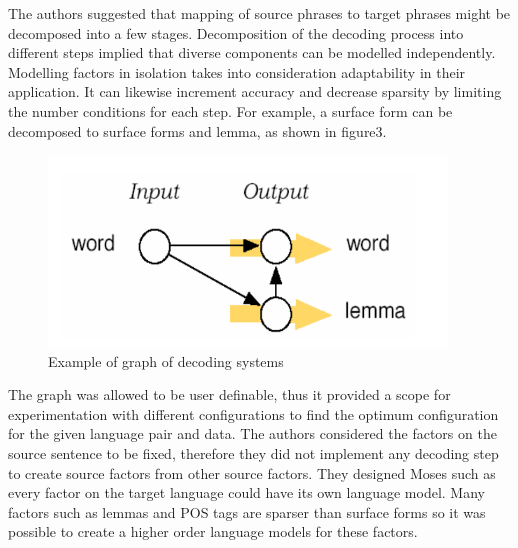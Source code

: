 The authors suggested that mapping of source phrases to target phrases might be decomposed into a few stages. Decomposition of the decoding process into different steps implied that diverse components can be modelled independently. Modelling factors in isolation takes into consideration adaptability in their application. It can likewise increment accuracy and decrease sparsity by limiting the number conditions for each step. For example, a surface form can be decomposed to surface forms and lemma, as shown in figure3.
\begin{figure}
\begin{center}
\includegraphics[width=300pt]{figures/moses3.png}
\caption{Example of graph of decoding systems} \label{fig1}
\end{center}
\end{figure}

The graph was allowed to be user definable, thus it provided a scope for experimentation with different configurations to find the optimum configuration for the given language pair and data. The authors considered the factors on the source sentence to be fixed, therefore they did not implement any decoding step to create source factors from other source factors. They designed Moses such as every factor on the target language could have its own language model.  Many factors such as lemmas and POS tags are sparser than surface forms so it was possible to create a higher order language models for these factors.

